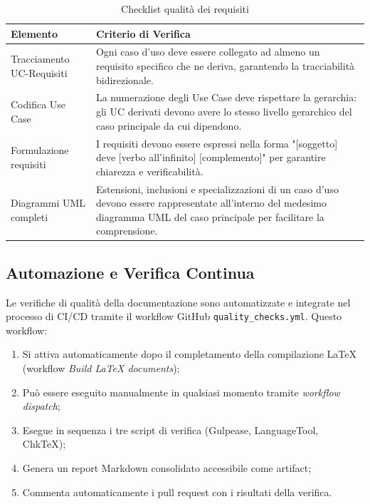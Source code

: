 \documentclass[a4paper,11pt,oneside]{scrartcl}
\begin{document}
\begin{table}[H]
\centering
\renewcommand{\arraystretch}{1.4}
\begin{tabularx}{\textwidth}{@{}p{}X@{}}
\toprule
\textbf{Elemento} & \textbf{Criterio di Verifica} \\
\midrule
Tracciamento UC-Requisiti & Ogni caso d'uso deve essere collegato ad almeno un requisito specifico che ne deriva, garantendo la tracciabilità bidirezionale. \\
\midrule
Codifica Use Case & La numerazione degli Use Case deve rispettare la gerarchia: gli UC derivati devono avere lo stesso livello gerarchico del caso principale da cui dipendono. \\
\midrule
Formulazione requisiti & I requisiti devono essere espressi nella forma "[soggetto] deve [verbo all'infinito] [complemento]" per garantire chiarezza e verificabilità. \\
\midrule
Diagrammi UML completi & Estensioni, inclusioni e specializzazioni di un caso d'uso devono essere rappresentate all'interno del medesimo diagramma UML del caso principale per facilitare la comprensione. \\
\bottomrule
\end{tabularx}
\caption{Checklist qualità dei requisiti}
\end{table}

\subsection{Automazione e Verifica Continua}

Le verifiche di qualità della documentazione sono automatizzate e integrate nel processo di CI/CD tramite il workflow GitHub \texttt{quality\_checks.yml}. Questo workflow:

\begin{enumerate}
    \item Si attiva automaticamente dopo il completamento della compilazione \LaTeX{} (workflow \textit{Build LaTeX documents});
    \item Può essere eseguito manualmente in qualsiasi momento tramite \textit{workflow dispatch};
    \item Esegue in sequenza i tre script di verifica (Gulpease, LanguageTool, ChkTeX);
    \item Genera un report Markdown consolidato accessibile come artifact;
    \item Commenta automaticamente i pull request con i risultati della verifica.
\end{enumerate}
\end{document}
